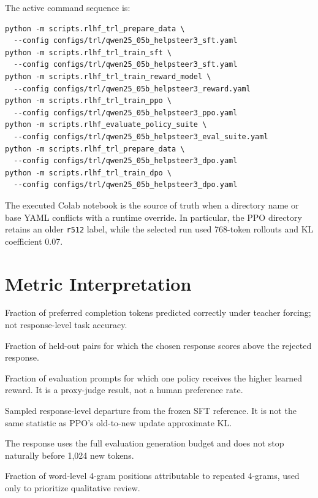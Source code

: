 \documentclass[11pt]{article}
\begin{document}
The active command sequence is:

\begin{verbatim}
python -m scripts.rlhf_trl_prepare_data \
  --config configs/trl/qwen25_05b_helpsteer3_sft.yaml
python -m scripts.rlhf_trl_train_sft \
  --config configs/trl/qwen25_05b_helpsteer3_sft.yaml
python -m scripts.rlhf_trl_train_reward_model \
  --config configs/trl/qwen25_05b_helpsteer3_reward.yaml
python -m scripts.rlhf_trl_train_ppo \
  --config configs/trl/qwen25_05b_helpsteer3_ppo.yaml
python -m scripts.rlhf_evaluate_policy_suite \
  --config configs/trl/qwen25_05b_helpsteer3_eval_suite.yaml
python -m scripts.rlhf_trl_prepare_data \
  --config configs/trl/qwen25_05b_helpsteer3_dpo.yaml
python -m scripts.rlhf_trl_train_dpo \
  --config configs/trl/qwen25_05b_helpsteer3_dpo.yaml
\end{verbatim}

The executed Colab notebook is the source of truth when a directory name or
base YAML conflicts with a runtime override. In particular, the PPO directory
retains an older \texttt{r512} label, while the selected run used 768-token
rollouts and KL coefficient 0.07.

\section{Metric Interpretation}

\begin{description}[style=nextline]
  \item[SFT mean token accuracy]
  Fraction of preferred completion tokens predicted correctly under teacher
  forcing; not response-level task accuracy.

  \item[Reward-model pairwise accuracy]
  Fraction of held-out pairs for which the chosen response scores above the
  rejected response.

  \item[Policy win rate]
  Fraction of evaluation prompts for which one policy receives the higher
  learned reward. It is a proxy-judge result, not a human preference rate.

  \item[Objective KL]
  Sampled response-level departure from the frozen SFT reference. It is not the
  same statistic as PPO's old-to-new update approximate KL.

  \item[Cap hit]
  The response uses the full evaluation generation budget and does not stop
  naturally before 1,024 new tokens.

  \item[Repeated 4-gram fraction]
  Fraction of word-level 4-gram positions attributable to repeated 4-grams,
  used only to prioritize qualitative review.
\end{description}
\end{document}
